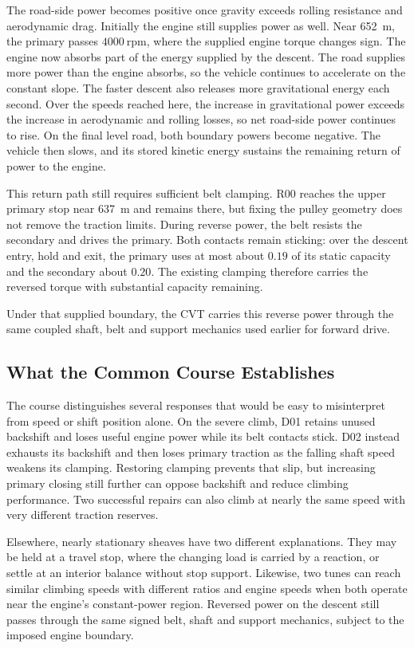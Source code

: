 \documentclass[11pt]{report}
\numberwithin{equation}{section}
\begin{document}
The road-side power becomes positive once gravity exceeds rolling resistance
and aerodynamic drag. Initially the engine still supplies power as well.
Near \SI{652}{m}, the primary passes \(4000~\mathrm{rpm}\), where the supplied
engine torque changes sign. The engine now absorbs part of the energy
supplied by the descent. The road supplies more power than the engine absorbs,
so the vehicle continues to accelerate
on the constant slope. The faster descent also releases more gravitational
energy each second. Over the speeds reached here, the increase in gravitational
power exceeds the increase in aerodynamic and rolling losses, so net road-side
power continues to rise. On the final level road, both boundary powers become
negative. The vehicle then slows, and its stored kinetic energy sustains the
remaining return of power to the engine.

This return path still requires sufficient belt clamping. R00 reaches the
upper primary stop near \SI{637}{m} and remains there, but fixing the pulley
geometry does not remove the traction limits. During reverse power, the belt
resists the secondary and drives the primary. Both contacts remain sticking:
over the descent entry, hold and exit, the primary uses at most about
\(0.19\) of its static capacity and the secondary about \(0.20\). The existing
clamping therefore carries the reversed torque with substantial capacity
remaining.

Under that supplied boundary, the CVT carries this reverse power through the
same coupled shaft, belt and support mechanics used earlier for forward drive.

\subsection{What the Common Course Establishes}
\label{sec:results_course_synthesis}

The course distinguishes several responses that would be easy to
misinterpret from speed or shift position alone. On the severe climb,
D01 retains unused backshift and loses useful engine power while its belt
contacts stick. D02 instead exhausts its backshift and then loses primary
traction as the falling shaft speed weakens its clamping. Restoring
clamping prevents that slip, but increasing primary closing still further
can oppose backshift and reduce climbing performance. Two successful
repairs can also climb at nearly the same speed with very different
traction reserves.

Elsewhere, nearly stationary sheaves have two different explanations.
They may be held at a travel stop, where the changing load is carried
by a reaction, or settle at an interior balance without stop support.
Likewise, two tunes can reach similar climbing speeds with different
ratios and engine speeds when both operate near the engine's
constant-power region. Reversed power on the descent still passes
through the same signed belt, shaft and support mechanics, subject
to the imposed engine boundary.
\end{document}
